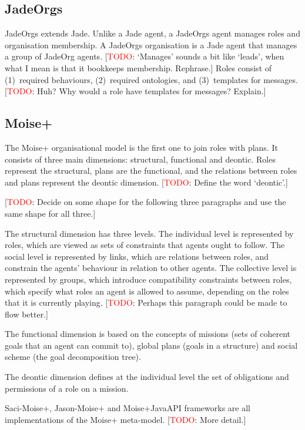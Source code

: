 \documentclass{article}
\newcommand{\todo}[1]{[\textcolor{red}{TODO}: #1]}
\begin{document}
\subsection{JadeOrgs}

JadeOrgs \cite{madrigal2009adding} extends Jade. Unlike a Jade agent, a
JadeOrgs agent manages roles and organisation membership. A JadeOrgs
organisation is a Jade agent that manages a group of JadeOrg agents.
\todo{`Manages' sounds a bit like `leads', when what I mean is that it
bookkeeps membership. Rephrase.} Roles consist of (1)~required behaviours,
(2)~required ontologies, and (3)~templates for messages. \todo{Huh? Why would a
role have templates for messages? Explain.}

\subsection{Moise+} 

The Moise+ \cite{conf/sbia/HubnerSB02} organisational model is the first one to
join roles with plans. It consists of three main dimensions: structural,
functional and deontic. Roles represent the structural, plans are the
functional, and the relations between roles and plans represent the deontic
dimension. \todo{Define the word `deontic'.}

\todo{Decide on some shape for the following three paragraphs and use the same
shape for all three.}

The structural dimension has three levels. The individual level is represented
by roles, which are viewed as sets of constraints that agents ought to follow.
The social level is represented by links, which are relations between roles,
and constrain the agents' behaviour in relation to other agents. The collective
level is represented by groups, which introduce compatibility constraints
between roles, which specify what roles an agent is allowed to assume,
depending on the roles that it is currently playing. \todo{Perhaps this
paragraph could be made to flow better.}

The functional dimension is based on the concepts of missions (sets of coherent
goals that an agent can commit to), global plans (goals in a structure) and
social scheme (the goal decomposition tree). 

The deontic dimension defines at the individual level the set of obligations
and permissions of a role on a mission.

Saci-Moise+, Jason-Moise+ and Moise+JavaAPI frameworks are all implementations
of the Moise+ meta-model. \todo{More detail.}
\end{document}
